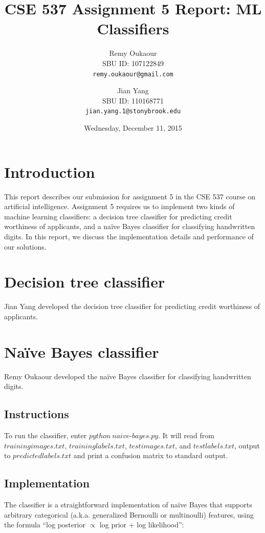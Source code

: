 \documentclass[11pt]{article}
\title{CSE 537 Assignment 5 Report: ML Classifiers}
\author{
Remy Oukaour \\
	{\small SBU ID: 107122849}\\
	{\small \texttt{remy.oukaour@gmail.com}}
\and
Jian Yang \\
	{\small SBU ID: 110168771}\\
	{\small \texttt{jian.yang.1@stonybrook.edu}}
}
\date{Wednesday, December 11, 2015}
\begin{document}
\maketitle

\section{Introduction}

This report describes our submission for assignment 5 in the CSE 537 course on
artificial intelligence. Assignment 5 requires us to implement two kinds of
machine learning classifiers: a decision tree classifier for predicting credit
worthiness of applicants, and a na{\"i}ve Bayes classifier for classifying
handwritten digits. In this report, we discuss the implementation details and
performance of our solutions.

\section{Decision tree classifier}

Jian Yang developed the decision tree classifier for predicting credit worthiness
of applicants.


\section{Na{\"i}ve Bayes classifier}

Remy Oukaour developed the na{\"i}ve Bayes classifier for classifying handwritten
digits.

\subsection{Instructions}

To run the classifier, enter $python\ naive\text{-}bayes.py$. It will read from
$trainingimages.txt$, $traininglabels.txt$, $testimages.txt$, and $testlabels.txt$,
output to $predictedlabels.txt$ and print a confusion matrix to standard output.

\subsection{Implementation}

The classifier is a straightforward implementation of na{\"i}ve Bayes that supports
arbitrary categorical (a.k.a. generalized Bernoulli or multinoulli) features, using
the formula ``log posterior $\propto$ log prior + log likelihood'':
\end{document}

